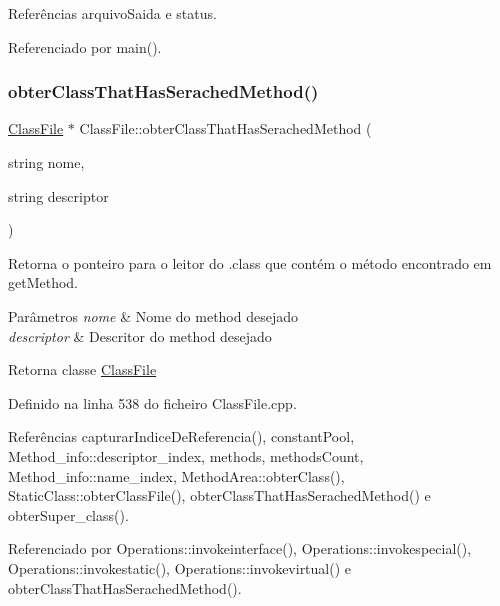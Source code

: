 Referências arquivo\+Saida e status.



Referenciado por main().

\mbox{\label{classClassFile_a4d0ac62c4d6218ddada33f715ebaf633}} 
\subsubsection{\texorpdfstring{obter\+Class\+That\+Has\+Serached\+Method()}{obterClassThatHasSerachedMethod()}}
{\footnotesize\ttfamily \hyperlink{classClassFile}{Class\+File} $\ast$ Class\+File\+::obter\+Class\+That\+Has\+Serached\+Method (\begin{DoxyParamCaption}\item[{string}]{nome,  }\item[{string}]{descriptor }\end{DoxyParamCaption})}



Retorna o ponteiro para o leitor do .class que contém o método encontrado em get\+Method. 


\begin{DoxyParams}{Parâmetros}
{\em nome} & Nome do method desejado \\
\hline
{\em descriptor} & Descritor do method desejado \\
\hline
\end{DoxyParams}
\begin{DoxyReturn}{Retorna}
classe \hyperlink{classClassFile}{Class\+File} 
\end{DoxyReturn}


Definido na linha 538 do ficheiro Class\+File.\+cpp.



Referências capturar\+Indice\+De\+Referencia(), constant\+Pool, Method\+\_\+info\+::descriptor\+\_\+index, methods, methods\+Count, Method\+\_\+info\+::name\+\_\+index, Method\+Area\+::obter\+Class(), Static\+Class\+::obter\+Class\+File(), obter\+Class\+That\+Has\+Serached\+Method() e obter\+Super\+\_\+class().



Referenciado por Operations\+::invokeinterface(), Operations\+::invokespecial(), Operations\+::invokestatic(), Operations\+::invokevirtual() e obter\+Class\+That\+Has\+Serached\+Method().

